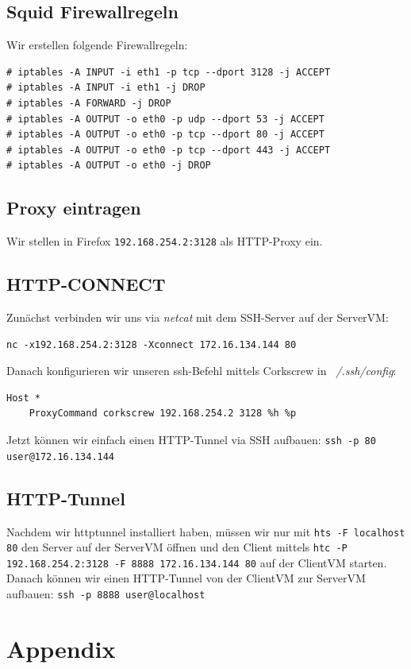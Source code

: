\documentclass[10pt,a4paper]{article}
\begin{document}
\subsection{Squid Firewallregeln}
Wir erstellen folgende Firewallregeln:
\begin{verbatim}
# iptables -A INPUT -i eth1 -p tcp --dport 3128 -j ACCEPT
# iptables -A INPUT -i eth1 -j DROP
# iptables -A FORWARD -j DROP
# iptables -A OUTPUT -o eth0 -p udp --dport 53 -j ACCEPT
# iptables -A OUTPUT -o eth0 -p tcp --dport 80 -j ACCEPT
# iptables -A OUTPUT -o eth0 -p tcp --dport 443 -j ACCEPT
# iptables -A OUTPUT -o eth0 -j DROP
\end{verbatim}

\subsection{Proxy eintragen}
Wir stellen in Firefox \texttt{192.168.254.2:3128} als HTTP-Proxy ein.

\subsection{HTTP-CONNECT}
Zunächst verbinden wir uns via \textit{netcat} mit dem SSH-Server auf der ServerVM:
\begin{verbatim}
nc -x192.168.254.2:3128 -Xconnect 172.16.134.144 80
\end{verbatim}
Danach konfigurieren wir unseren ssh-Befehl mittels Corkscrew in \textit{~/.ssh/config}:
\begin{verbatim}
Host *
    ProxyCommand corkscrew 192.168.254.2 3128 %h %p
\end{verbatim}
Jetzt können wir einfach einen HTTP-Tunnel via SSH aufbauen: \texttt{ssh -p 80 user@172.16.134.144}

\subsection{HTTP-Tunnel}
Nachdem wir httptunnel installiert haben, müssen wir nur mit
\texttt{hts -F localhost 80} den Server auf der ServerVM öffnen und
den Client mittels \texttt{htc -P 192.168.254.2:3128 -F 8888
172.16.134.144 80} auf der ClientVM starten. Danach können wir einen
HTTP-Tunnel von der ClientVM zur ServerVM aufbauen:
\texttt{ssh -p 8888 user@localhost}

\newpage
\section*{Appendix}
\end{document}
